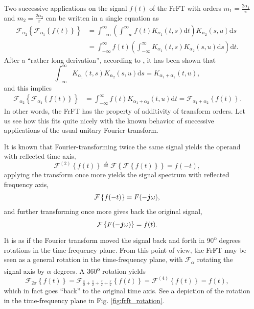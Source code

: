 Two successive applications on the signal $f(t)$ of the FrFT with orders $m_1 = \frac{2\alpha_1}{\pi}$ and $m_2 = \frac{2\alpha_2}{\pi}$ can be written in a single equation as
\begin{align}
\label{eq:frftsucessive}
\mathcal{F}_{\alpha_2} \left\{ \mathcal{F}_{\alpha_1} \left\{ f(t) \right\} \right\} &=
\int_{-\infty}^{\infty} 
\left( \int_{-\infty}^{\infty} f(t) K_{\alpha_1} (t, s) \mathrm{d}t \right)
K_{\alpha_2} (s, u) \mathrm{d}s \\
&= 
\int_{-\infty}^{\infty}
f(t)
\left(
\int_{-\infty}^{\infty}
K_{\alpha_1} (t, s) K_{\alpha_2} (s, u) \mathrm{d}s
\right)
\mathrm{d}t.
\end{align}
After a ``rather long derivation'', according to \cite{almeida1994fractional}, it has been shown that
\begin{equation}
\label{eq:summingangles}
\int_{-\infty}^{\infty}
K_{\alpha_1} (t, s) K_{\alpha_2} (s, u) \mathrm{d}s = 
K_{\alpha_1 + \alpha_2} (t, u),
\end{equation}
and this implies
\begin{align}
\mathcal{F}_{\alpha_2} \left\{ \mathcal{F}_{\alpha_1} \left\{ f(t) \right\} \right\} &=
\int_{-\infty}^{\infty}
f(t)
K_{\alpha_1 + \alpha_2} (t, u)
\mathrm{d}t
= \mathcal{F}_{\alpha_1 + \alpha_2} \left\{ f(t) \right\}.
\end{align}
In other words, the FrFT has the property of additivity of transform orders. Let us see how this fits quite nicely with the known behavior of successive applications of the usual unitary Fourier transform.

It is known that Fourier-transforming twice the same signal yields the operand with reflected time axis,
\begin{equation}
\mathcal{F}^{(2)} \left\{ f(t) \right\} \overset{\Delta}{=}
\mathcal{F} \left\{ \mathcal{F} \left\{ f(t) \right\} \right\}
= f(-t),
\end{equation}
applying the transform once more yields the signal spectrum with reflected frequency axis,
\begin{equation}
\mathcal{F} \left\{ f(-t) \right\} = F(-\boldsymbol{j} \omega),
\end{equation}
and further transforming once more gives back the original signal,
\begin{equation}
\mathcal{F} \left\{ F(-\boldsymbol{j} \omega) \right\} = f(t).
\end{equation}
It is as if the Fourier transform moved the signal back and forth in 90\textsuperscript{o} degrees rotations in the time-frequency plane. From this point of view, the FrFT may be seen as a general rotation in the time-frequency plane, with $\mathcal{F}_\alpha$ rotating the signal axis by $\alpha$ degrees. A 360\textsuperscript{o} rotation yields
\begin{equation}
\mathcal{F}_{2\pi} \left\{ f(t) \right\} = \mathcal{F}_{
\frac{\pi}{2} + 
\frac{\pi}{2} + 
\frac{\pi}{2} + 
\frac{\pi}{2}
} \left\{ f(t) \right\} =
\mathcal{F}^{(4)} \left\{ f(t) \right\} = f(t),
\end{equation}
which in fact goes ``back'' to the original time axis. See a depiction of the rotation in the time-frequency plane in Fig. \ref{fig:frft_rotation}.

